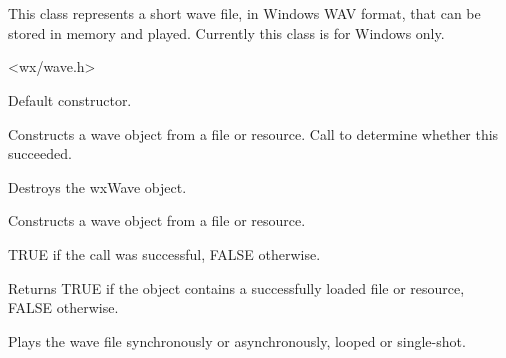 \section{}\label{wxwave}

This class represents a short wave file, in Windows WAV format, that
can be stored in memory and played. Currently this class is for Windows
only.




<wx/wave.h>


\label{wxwaveconstr}


Default constructor.


Constructs a wave object from a file or resource. Call  to
determine whether this succeeded.






Destroys the wxWave object.

\label{wxwavecreate}


Constructs a wave object from a file or resource.





TRUE if the call was successful, FALSE otherwise.

\label{wxwaveisok}


Returns TRUE if the object contains a successfully loaded file or resource, FALSE otherwise.

\label{wxwaveplay}


Plays the wave file synchronously or asynchronously, looped or single-shot.


